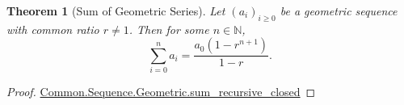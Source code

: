 \documentclass{article}
\newtheorem{theorem}{Theorem}
\begin{document}
\begin{theorem}[Sum of Geometric Series]

Let $(a_i)_{i \geq 0}$ be a geometric sequence with common ratio $r \neq 1$.
Then for some $n \in \mathbb{N}$,
$$\sum_{i=0}^n a_i = \frac{a_0(1 - r^{n+1})}{1 - r}.$$

\end{theorem}

\begin{proof}

\href{Geometric.lean}{Common.Sequence.Geometric.sum\_recursive\_closed}

\end{proof}
\end{document}
